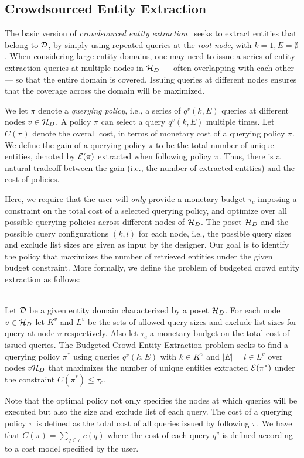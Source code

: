 \subsection{Crowdsourced Entity Extraction}
\label{sec:extraction}
The basic version of {\em crowdsourced entity extraction}~\cite{trushkowsky:2013} seeks to extract entities that belong to $\mathcal{D}$, by simply using repeated queries at the {\em root node}, with $k = 1, E = \emptyset$. When considering large entity domains, one may need to issue a series of entity extraction queries at multiple nodes in  $\mathcal{H}_D$ --- often overlapping with each other --- so that the entire domain is covered. Issuing queries at different nodes ensures that the coverage across the domain will be maximized. 

We let $\pi$ denote a {\em querying policy}, i.e., a series of $q^v(k,E)$ queries at different nodes $v \in \mathcal{H}_D$. A policy $\pi$ can select a query $q^v(k,E)$ multiple times. Let $C(\pi)$ denote the overall cost, in terms of monetary cost of a querying policy $\pi$. We define the gain of a querying policy $\pi$ to be the total number of unique entities, denoted by $\mathcal{E}(\pi)$ extracted when following policy $\pi$. Thus, there is a natural tradeoff between the gain (i.e., the number of extracted entities) and the cost of policies. 

Here, we require that the user will {\em only} provide a monetary budget $\tau_c$ imposing a constraint on the total cost of a selected querying policy, and optimize over all possible querying policies across different nodes of $\mathcal{H}_D$. The poset $\mathcal{H}_D$ and the possible query configurations $(k,l)$ for each node, i.e., the possible query sizes and exclude list sizes are given as input by the designer. Our goal is to identify the policy that maximizes the number of retrieved entities under the given budget constraint. More formally, we define the problem of budgeted crowd entity extraction as follows:

\begin{problem} \ \\
Let $\mathcal{D}$ be a given entity domain characterized by a poset $\mathcal{H}_D$. For each node $v \in \mathcal{H}_D$ let $K^v$ and $L^v$ be the sets of allowed query sizes and exclude list sizes for query at node $v$ respectively. Also let $\tau_c$ a monetary budget on the total cost of issued queries. The Budgeted Crowd Entity Extraction problem seeks to find a querying policy $\pi^*$ using queries $q^v(k,E)$ with $k \in K^v$ and $|E| = l \in L^v$ over nodes $v \mathcal{H}_D$ that maximizes the number of unique entities extracted $\mathcal{E}(\pi^*)$ under the constraint $C(\pi^*) \leq \tau_c$.
\end{problem}
Note that the optimal policy not only specifies the nodes at which queries will be executed but also the size and exclude list of each query. The cost of a querying policy $\pi$ is defined as the total cost of all queries issued by following $\pi$. We have that $C(\pi) = \sum_{q \in \pi} c(q)$ where the cost of each query $q^v$ is defined according to a cost model specified by the user. 

